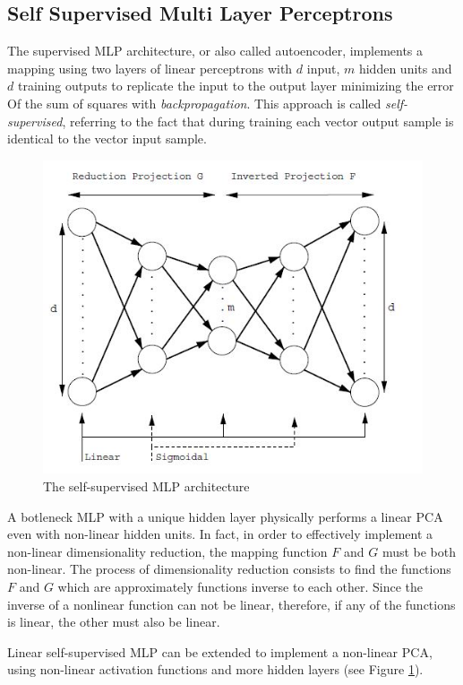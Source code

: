 \documentclass{article}
\begin{document}
\subsection{Self Supervised Multi Layer Perceptrons}
The supervised MLP architecture, or also called autoencoder, implements a mapping using two layers of linear perceptrons with $ d $ input, $ m $ hidden units and $ d $ training outputs to replicate the input to the output layer minimizing the error Of the sum of squares with \textit{backpropagation}. This approach is called \textit{self-supervised}, referring to the fact that during training each vector output sample is identical to the vector input sample.
\begin{figure}[htp]\centering
\includegraphics[width=1.\columnwidth]{images_fractal/frac_2.JPG}
\caption{ The self-supervised MLP architecture } 
\label{fig:fig_2}
\end{figure}    

A botleneck MLP with a unique hidden layer physically performs a linear PCA even with non-linear hidden units. In fact, in order to effectively implement a non-linear dimensionality reduction, the mapping function $ F $ and $ G $ must be both non-linear. The process of dimensionality reduction consists to find the functions $ F $ and $ G $ which are approximately functions inverse to each other. Since the inverse of a nonlinear function can not be linear, therefore, if any of the functions is linear, the other must also be linear.

Linear self-supervised MLP can be extended to implement a non-linear PCA, using non-linear activation functions and more hidden layers (see Figure \ref{fig:fig_2}).
\end{document}
